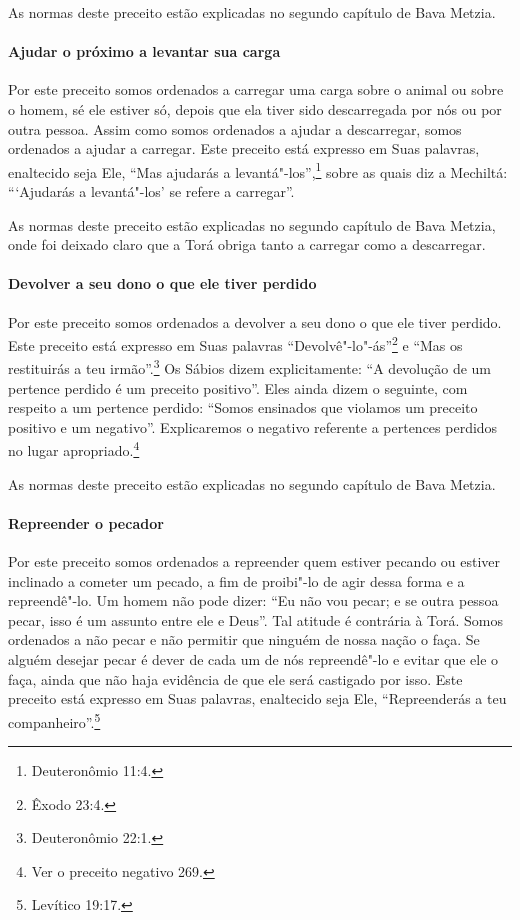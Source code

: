 \begin{multicols}{2}
As normas deste preceito estão explicadas no segundo capítulo de Bava Metzia\starr.

\paragraph{Ajudar o próximo a levantar sua carga}

Por este preceito somos ordenados a carregar uma carga sobre o animal
ou sobre o homem, sé ele estiver só, depois que ela tiver sido
descarregada por nós ou por outra pessoa. Assim como somos ordenados a
ajudar a descarregar, somos ordenados a ajudar a carregar. Este
preceito está expresso em Suas palavras, enaltecido seja Ele, ``Mas
ajudarás a levantá"-los'',\footnote{Deuteronômio 11:4.} sobre as quais diz a
Mechiltá\starr: ```Ajudarás a levantá"-los' se refere a carregar''.

As normas deste preceito estão explicadas no segundo capítulo de Bava
Metzia\starr, onde foi deixado claro que a Torá\starr{} obriga tanto a carregar como
a descarregar.

\paragraph{Devolver a seu dono o que ele tiver perdido}

Por este preceito somos ordenados a devolver a seu dono o que ele tiver
perdido. Este preceito está expresso em Suas palavras ``Devolvê"-lo"-ás''\footnote{Êxodo 23:4.} e ``Mas os restituirás a teu irmão''.\footnote{Deuteronômio 22:1.}
Os Sábios dizem explicitamente: ``A devolução de um pertence perdido é
um preceito positivo''. Eles ainda dizem o seguinte, com respeito a um
pertence perdido: ``Somos ensinados que violamos um preceito positivo e
um negativo''. Explicaremos o negativo referente a pertences perdidos no lugar apropriado.\footnote{Ver o preceito negativo 269.}

As normas deste preceito estão explicadas no segundo capítulo de Bava
Metzia\starr.

\paragraph{Repreender o pecador}

Por este preceito somos ordenados a repreender quem estiver pecando ou
estiver inclinado a cometer um pecado, a fim de proibi"-lo de agir dessa
forma e a repreendê"-lo. Um homem não pode dizer: ``Eu não vou pecar; e
se outra pessoa pecar, isso é um assunto entre ele e Deus''. Tal atitude
é contrária à Torá\starr. Somos ordenados a não pecar e não permitir que
ninguém de nossa nação o faça. Se alguém desejar pecar é dever de cada
um de nós repreendê"-lo e evitar que ele o faça, ainda que não haja
evidência de que ele será castigado por isso. Este preceito está
expresso em Suas palavras, enaltecido seja Ele, ``Repreenderás a teu
companheiro''.\footnote{Levítico 19:17.}


\end{multicols}
